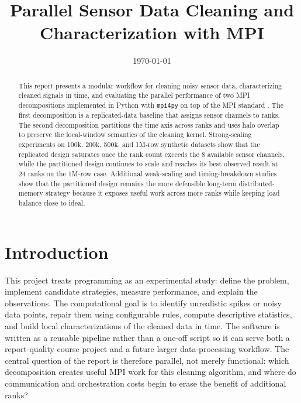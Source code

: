 \documentclass[11pt]{article}
\title{Parallel Sensor Data Cleaning and Characterization with MPI}
\date{\today}
\begin{document}
\maketitle

\begin{abstract}
This report presents a modular workflow for cleaning noisy sensor data, characterizing cleaned signals in time, and evaluating the parallel performance of two MPI decompositions implemented in Python with \texttt{mpi4py} on top of the MPI standard \cite{mpi41,dalcin2021mpi4py}. The first decomposition is a replicated-data baseline that assigns sensor channels to ranks. The second decomposition partitions the time axis across ranks and uses halo overlap to preserve the local-window semantics of the cleaning kernel. Strong-scaling experiments on 100k, 200k, 500k, and 1M-row synthetic datasets show that the replicated design saturates once the rank count exceeds the 8 available sensor channels, while the partitioned design continues to scale and reaches its best observed result at 24 ranks on the 1M-row case. Additional weak-scaling and timing-breakdown studies show that the partitioned design remains the more defensible long-term distributed-memory strategy because it exposes useful work across more ranks while keeping load balance close to ideal.
\end{abstract}

\section{Introduction}
This project treats programming as an experimental study: define the problem, implement candidate strategies, measure performance, and explain the observations. The computational goal is to identify unrealistic spikes or noisy data points, repair them using configurable rules, compute descriptive statistics, and build local characterizations of the cleaned data in time. The software is written as a reusable pipeline rather than a one-off script so it can serve both a report-quality course project and a future larger data-processing workflow. The central question of the report is therefore parallel, not merely functional: which decomposition creates useful MPI work for this cleaning algorithm, and where do communication and orchestration costs begin to erase the benefit of additional ranks?
\end{document}
